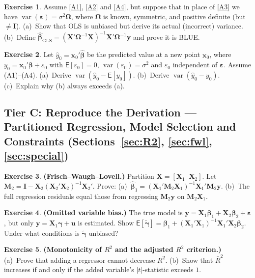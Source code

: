 \documentclass[12pt,a4paper]{article}
\theoremstyle{definition}
\newtheorem{exercise}{Exercise}
\newcommand{\extier}{}
\newcommand{\exercisetier}[1]{\renewcommand{\extier}{#1}\setcounter{exercise}{0}}
\newcommand\expc{\mathsf{E}}
\DeclareMathOperator\var{var}
\newcommand{\bX}{\mathbf{X}}
\newcommand{\by}{\mathbf{y}}
\newcommand{\bx}{\mathbf{x}}
\def\bb{\boldsymbol{\beta}}
\newcommand{\be}{\boldsymbol{\varepsilon}}
\newcommand{\bI}{\mathbf{I}}
\newcommand{\bM}{\mathbf{M}}
\begin{document}
\begin{exercise}\label{ex:B5}
Assume \ref{A1}, \ref{A2} and \ref{A4}, but suppose that in place of \ref{A3} we have $\var(\be) = \sigma^2\boldsymbol\Omega$, where $\boldsymbol\Omega$ is known, symmetric, and positive definite (but $\neq \bI$). (a)~Show that OLS is unbiased but derive its actual (incorrect) variance. (b)~Define $\hat{\bb}_{\mathrm{GLS}} = (\bX'\boldsymbol\Omega^{-1}\bX)^{-1}\bX'\boldsymbol\Omega^{-1}\by$ and prove it is BLUE.
\end{exercise}

\begin{exercise}\label{ex:B6}
Let $\hat{y}_0 = \bx_0'\hat{\bb}$ be the predicted value at a new point $\bx_0$, where $y_0 = \bx_0'\bb + \varepsilon_0$ with $\expc[\varepsilon_0] = 0$, $\var(\varepsilon_0) = \sigma^2$ and $\varepsilon_0$ independent of $\be$. Assume (A1)--(A4). (a)~Derive $\var(\hat{y}_0 - \expc[y_0])$. (b)~Derive $\var(\hat{y}_0 - y_0)$. (c)~Explain why (b) always exceeds (a).
\end{exercise}

\exercisetier{C}
\subsection*{Tier C: Reproduce the Derivation --- Partitioned Regression, Model Selection and Constraints (Sections~\ref{sec:R2}, \ref{sec:fwl}, \ref{sec:special})}

\begin{exercise}\label{ex:C1}
\textbf{(Frisch--Waugh--Lovell.)} Partition $\bX = [\bX_1 \;\; \bX_2]$. Let $\bM_2 = \bI - \bX_2(\bX_2'\bX_2)^{-1}\bX_2'$. Prove: (a)~$\hat{\bb}_1 = (\bX_1'\bM_2\bX_1)^{-1}\bX_1'\bM_2\by$. (b)~The full regression residuals equal those from regressing $\bM_2\by$ on $\bM_2\bX_1$.
\end{exercise}

\begin{exercise}\label{ex:C2}
\textbf{(Omitted variable bias.)} The true model is $\by = \bX_1\bb_1 + \bX_2\bb_2 + \be$, but only $\by = \bX_1\boldsymbol\gamma + \mathbf{u}$ is estimated. Show $\expc[\tilde{\boldsymbol\gamma}] = \bb_1 + (\bX_1'\bX_1)^{-1}\bX_1'\bX_2\bb_2$. Under what conditions is $\tilde{\boldsymbol\gamma}$ unbiased?
\end{exercise}

\begin{exercise}\label{ex:C3}
\textbf{(Monotonicity of $R^2$ and the adjusted $R^2$ criterion.)} (a)~Prove that adding a regressor cannot decrease $R^2$. (b)~Show that $\bar{R}^2$ increases if and only if the added variable's $|t|$-statistic exceeds $1$.
\end{exercise}
\end{document}
